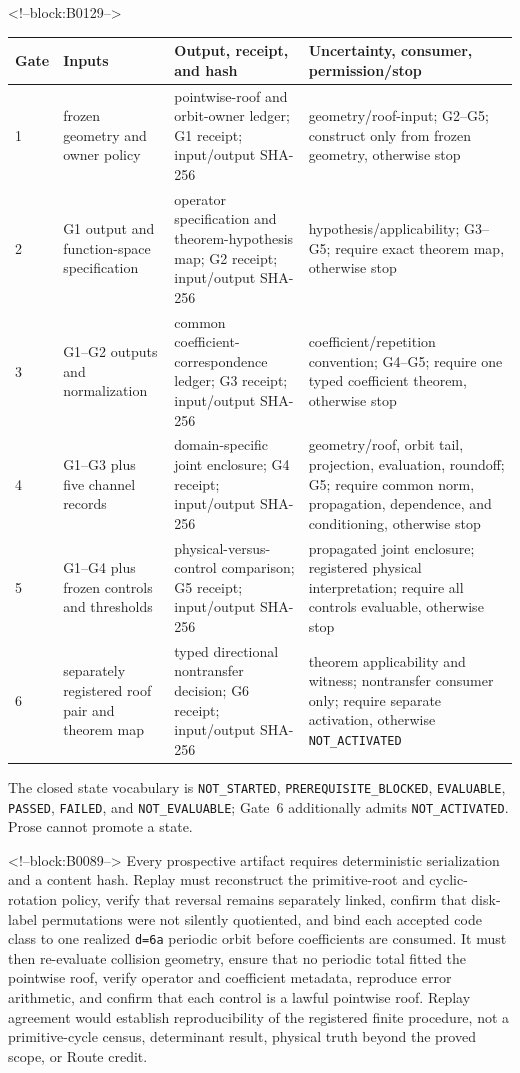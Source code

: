 \documentclass[11pt,a4paper]{article}
\begin{document}
<!--block:B0129-->
\begin{center}
\scriptsize
\begin{tabularx}{\linewidth}{@{}l p{.19\linewidth} p{.27\linewidth} X@{}}
\toprule
Gate & Inputs & Output, receipt, and hash & Uncertainty, consumer, permission/stop \\
\midrule
1 & frozen geometry and owner policy & pointwise-roof and orbit-owner ledger; G1 receipt; input/output SHA-256 & geometry/roof-input; G2--G5; construct only from frozen geometry, otherwise stop \\
2 & G1 output and function-space specification & operator specification and theorem-hypothesis map; G2 receipt; input/output SHA-256 & hypothesis/applicability; G3--G5; require exact theorem map, otherwise stop \\
3 & G1--G2 outputs and normalization & common coefficient-correspondence ledger; G3 receipt; input/output SHA-256 & coefficient/repetition convention; G4--G5; require one typed coefficient theorem, otherwise stop \\
4 & G1--G3 plus five channel records & domain-specific joint enclosure; G4 receipt; input/output SHA-256 & geometry/roof, orbit tail, projection, evaluation, roundoff; G5; require common norm, propagation, dependence, and conditioning, otherwise stop \\
5 & G1--G4 plus frozen controls and thresholds & physical-versus-control comparison; G5 receipt; input/output SHA-256 & propagated joint enclosure; registered physical interpretation; require all controls evaluable, otherwise stop \\
6 & separately registered roof pair and theorem map & typed directional nontransfer decision; G6 receipt; input/output SHA-256 & theorem applicability and witness; nontransfer consumer only; require separate activation, otherwise \texttt{NOT_ACTIVATED} \\
\bottomrule
\end{tabularx}
\end{center}
The closed state vocabulary is \texttt{NOT_STARTED},
\texttt{PREREQUISITE_BLOCKED}, \texttt{EVALUABLE}, \texttt{PASSED},
\texttt{FAILED}, and \texttt{NOT_EVALUABLE}; Gate~6 additionally admits
\texttt{NOT_ACTIVATED}.  Prose cannot promote a state.

<!--block:B0089-->
Every prospective artifact requires deterministic serialization and a content hash. Replay must reconstruct the primitive-root and cyclic-rotation policy, verify that reversal remains separately linked, confirm that disk-label permutations were not silently quotiented, and bind each accepted code class to one realized \texttt{d=6a} periodic orbit before coefficients are consumed. It must then re-evaluate collision geometry, ensure that no periodic total fitted the pointwise roof, verify operator and coefficient metadata, reproduce error arithmetic, and confirm that each control is a lawful pointwise roof. Replay agreement would establish reproducibility of the registered finite procedure, not a primitive-cycle census, determinant result, physical truth beyond the proved scope, or Route credit.
\end{document}
